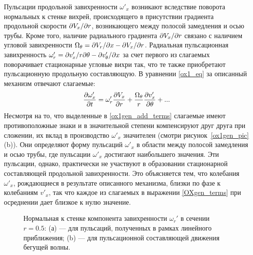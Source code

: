Пульсации продольной завихренности $\omega'_x$ возникают вследствие поворота нормальных к стенке вихрей, происходящего в присутствии градиента продольной скорости $\partial V_x/ \partial r$, возникающего между полосой замедления и осью трубы. Кроме того, наличие радиального градиента $\partial V_x/ \partial r$ связано с наличием угловой завихренности $\Omega_\theta = \partial V_r / \partial x - \partial V_x / \partial r$. Радиальная пульсационная завихренность $\omega'_r = \partial v'_x / r \partial \theta - \partial v'_\theta / \partial x$ за счет первого из слагаемых поворачивает стационарные угловые вихри так, что те также приобретают пульсационную продольную составляющую. В уравнении \eqref{ox1_eq} за описанный механизм отвечают слагаемые:
\begin{equation}\label{ox1gen_add_terms}
\frac{\partial \omega'_x}{\partial t} = \omega'_r \frac {\partial V_x}{\partial r} + \frac{\Omega_\theta}{r} \frac{\partial v'_x}{\partial \theta} + ...
\end{equation}
Несмотря на то, что выделенные в \eqref{ox1gen_add_terms} слагаемые имеют противоположные знаки и в значительной степени компенсируют друг друга при сложении, их вклад в производство $\omega'_x$ значителен (смотри рисунок~\ref{ox1gen_pic}(b)). Они определяют форму пульсаций $\omega'_x$ в области между полосой замедления и осью трубы, где пульсации $\omega'_x$ достигают наибольшего значения. Эти пульсации, однако, практически не участвуют в образовании стационарной составляющей продольной завихренности. Это объясняется тем, что колебания $\omega'_x$, рождающиеся в результате описанного механизма, близки по фазе к колебаниям $v'_x$, так что каждое из слагаемых в выражении \eqref{OXgen_terms} при осреднении дает близкое к нулю значение.

\begin{figure}
\caption{Нормальная к стенке компонента завихренности $\omega_r'$ в сечении $r = 0.5$: (а) --- для пульсаций, полученных в рамках линейного приближения; (b) --- для пульсационной составляющей движения бегущей волны. }
\label{pipetw_or1_pic}
\end{figure}

